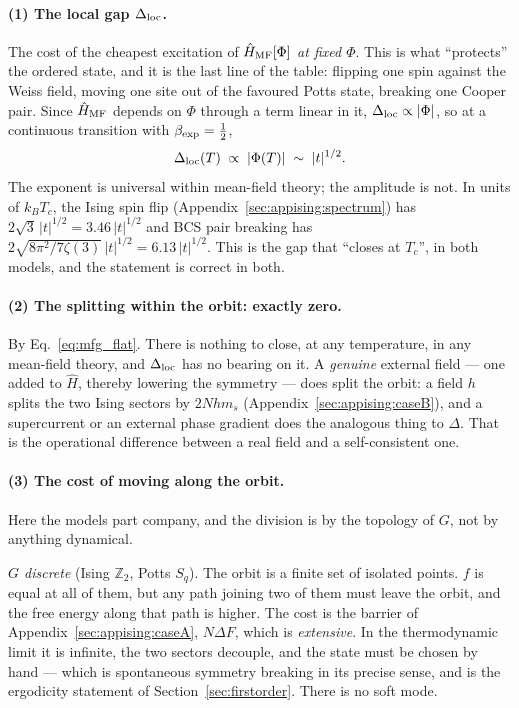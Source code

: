 \documentclass[10pt,a4paper]{article}
\theoremstyle{remark}
\begin{document}
\paragraph{(1) The local gap $\Delta_{\rm loc}$.} The cost of the cheapest
excitation of $\hat H_{\rm MF}[\Phi]$ \emph{at fixed $\Phi$}. This is what
``protects'' the ordered state, and it is the last line of the table: flipping one
spin against the Weiss field, moving one site out of the favoured Potts state,
breaking one Cooper pair. Since $\hat H_{\rm MF}$ depends on $\Phi$ through a
term linear in it, $\Delta_{\rm loc}\propto|\Phi|$, so at a continuous transition
with $\beta_{\rm exp}=\tfrac12$,
\begin{equation}\label{eq:mfg_gap}
\Delta_{\rm loc}(T)\;\propto\;|\Phi(T)|\;\sim\;|t|^{1/2}.
\end{equation}
The exponent is universal within mean-field theory; the amplitude is not. In
units of $k_BT_c$, the Ising spin flip (Appendix~\ref{sec:appising:spectrum})
has $2\sqrt3\,|t|^{1/2}=3.46\,|t|^{1/2}$ and BCS pair breaking has
$2\sqrt{8\pi^{2}/7\zeta(3)}\,|t|^{1/2}=6.13\,|t|^{1/2}$.
This is the gap that ``closes at $T_c$'', in both models, and the statement is
correct in both.

\paragraph{(2) The splitting within the orbit: exactly zero.} By
Eq.~\eqref{eq:mfg_flat}. There is nothing to close, at any temperature, in any
mean-field theory, and $\Delta_{\rm loc}$ has no bearing on it. A \emph{genuine}
external field --- one added to $\hat H$, thereby lowering the symmetry --- does
split the orbit: a field $h$ splits the two Ising sectors by $2Nhm_s$
(Appendix~\ref{sec:appising:caseB}), and a supercurrent or an external phase
gradient does the analogous thing to $\Delta$. That is the operational difference
between a real field and a self-consistent one.

\paragraph{(3) The cost of moving along the orbit.} Here the models part company,
and the division is by the topology of $G$, not by anything dynamical.

\emph{$G$ discrete} (Ising $\mathbb{Z}_2$, Potts $S_q$). The orbit is a finite
set of isolated points. $f$ is equal at all of them, but any path joining two of
them must leave the orbit, and the free energy along that path is higher. The
cost is the barrier of Appendix~\ref{sec:appising:caseA}, $N\Delta F$, which is
\emph{extensive}. In the thermodynamic limit it is infinite, the two sectors
decouple, and the state must be chosen by hand --- which is spontaneous symmetry
breaking in its precise sense, and is the ergodicity statement of
Section~\ref{sec:firstorder}. There is no soft mode.
\end{document}
